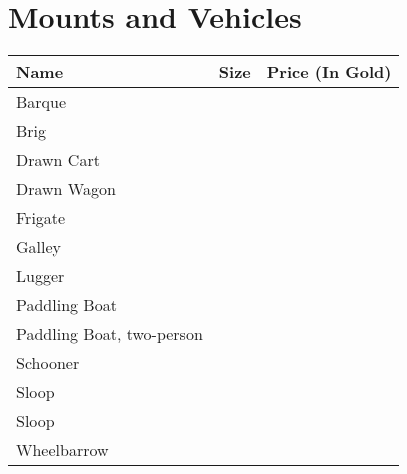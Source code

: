 \section{Mounts and Vehicles}\label{sec:mountsVehicles}
\begin{longtable}{l | r | r}
	Name & Size & Price (In Gold)\\ \hline
	Barque  &  &  \\
	Brig  &  &  \\
	Drawn Cart  &  &  \\
	Drawn Wagon  &  &  \\
	Frigate  &  &  \\
	Galley  &  &  \\
	Lugger  &  &  \\
	Paddling Boat  &  &  \\
	Paddling Boat, two-person  &  &  \\
	Schooner  &  &  \\
	Sloop  &  &  \\
	Sloop  &  &  \\
	Wheelbarrow  &  &  \\
\end{longtable}
